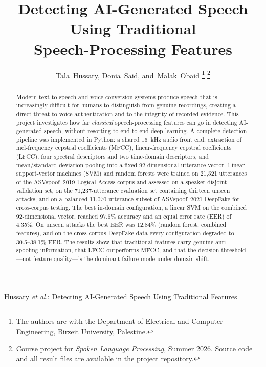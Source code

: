 \documentclass[journal,10pt]{IEEEtran}
\begin{document}
\title{Detecting AI-Generated Speech Using Traditional\\
Speech-Processing Features}

\author{%
  Tala~Hussary,
  Donia~Said,
  and~Malak~Obaid%
  \thanks{The authors are with the Department of Electrical and Computer
  Engineering, Birzeit University, Palestine.}%
  \thanks{Course project for \emph{Spoken Language Processing}, Summer 2026.
  Source code and all result files are available in the project repository.}%
}

%
{Hussary \MakeLowercase{\textit{et al.}}: Detecting AI-Generated Speech Using Traditional Features}

\maketitle

\begin{abstract}
Modern text-to-speech and voice-conversion systems produce speech that is
increasingly difficult for humans to distinguish from genuine recordings,
creating a direct threat to voice authentication and to the integrity of
recorded evidence. This project investigates how far \emph{classical}
speech-processing features can go in detecting AI-generated speech, without
resorting to end-to-end deep learning. A complete detection pipeline was
implemented in Python: a shared 16~kHz audio front end, extraction of
mel-frequency cepstral coefficients (MFCC), linear-frequency cepstral
coefficients (LFCC), four spectral descriptors and two time-domain
descriptors, and mean/standard-deviation pooling into a fixed
92-dimensional utterance vector. Linear support-vector machines (SVM) and
random forests were trained on 21{,}521 utterances of the ASVspoof~2019
Logical Access corpus and assessed on a speaker-disjoint validation set, on
the 71{,}237-utterance evaluation set containing thirteen unseen attacks,
and on a balanced 11{,}070-utterance subset of ASVspoof~2021 DeepFake for
cross-corpus testing. The best in-domain configuration, a linear SVM on the
combined 92-dimensional vector, reached 97.6\% accuracy and an equal error
rate (EER) of 4.35\%. On unseen attacks the best EER was 12.84\% (random
forest, combined features), and on the cross-corpus DeepFake data every
configuration degraded to 30.5--38.1\% EER. The results show that
traditional features carry genuine anti-spoofing information, that LFCC
outperforms MFCC, and that the decision threshold---not feature
quality---is the dominant failure mode under domain shift.
\end{abstract}
\end{document}
